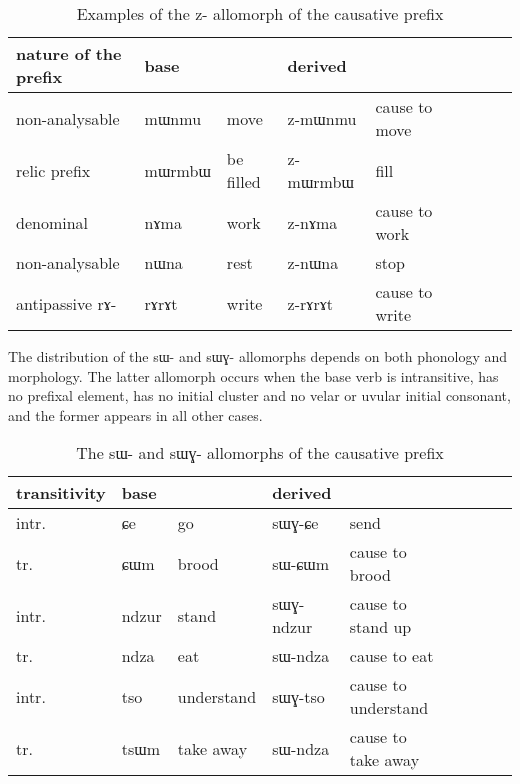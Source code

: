 \documentclass[oldfontcommands,oneside,a4paper,11pt]{article}
\newcommand{\ipa}[1]{{\phon \mbox{#1}}} %
\begin{document}
\begin{table}[h]
\caption{Examples of the \ipa{z}- allomorph of the causative prefix}\label{tab:causative.z} \centering
\begin{tabular}{lllllllll} \toprule
nature of the prefix & base  & &derived  \\
\midrule
non-analysable &  \ipa{mɯnmu} &move& \ipa{z-mɯnmu} &cause to move\\
relic prefix &  \ipa{mɯrmbɯ} &be filled& \ipa{z-mɯrmbɯ} &fill\\
denominal &  \ipa{nɤma} &work& \ipa{z-nɤma} &cause to work\\
non-analysable &  \ipa{nɯna} &rest& \ipa{z-nɯna} &stop\\
antipassive \ipa{rɤ-} &  \ipa{rɤrɤt} &write& \ipa{z-rɤrɤt} &cause to write\\

\bottomrule
\end{tabular}
\end{table}


The distribution of the \ipa{sɯ-} and \ipa{sɯɣ-} allomorphs depends on both phonology and morphology. The   latter allomorph occurs when the base verb is intransitive, has no  prefixal element, has no initial cluster and no velar or uvular initial consonant, and the former appears in all other cases.

\begin{table}[h]
\caption{The \ipa{sɯ}- and  \ipa{sɯɣ-} allomorphs of the causative prefix}\label{tab:causative.sW} \centering
\begin{tabular}{lllllllll} \toprule
 transitivity & base & & derived & \\
 \midrule
 intr. & \ipa{ɕe} & go & \ipa{sɯɣ-ɕe} & send \\
  tr. & \ipa{ɕɯm} & brood & \ipa{sɯ-ɕɯm} & cause to brood \\
  intr. & \ipa{ndzur} & stand & \ipa{sɯɣ-ndzur} & cause to stand up \\
  tr. & \ipa{ndza} & eat & \ipa{sɯ-ndza} & cause to eat \\ 
    intr. & \ipa{tso} & understand & \ipa{sɯɣ-tso} & cause to understand \\
  tr. & \ipa{tsɯm} & take away & \ipa{sɯ-ndza} & cause to take away \\ 
 \bottomrule
\end{tabular}
\end{table}
 
\end{document}

